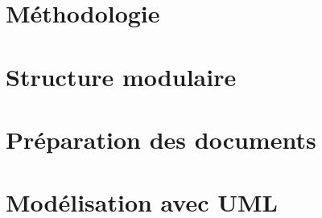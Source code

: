        
        \section{Méthodologie}
                \lipsum[1]
        \section{Structure modulaire}
                \lipsum[1]
        \section{Préparation des documents}
                
        \section{Modélisation avec UML}
        
        
